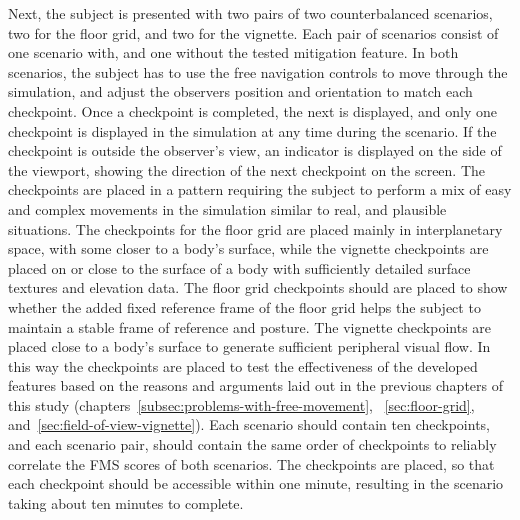 Next, the subject is presented with two pairs of two counterbalanced scenarios, two for the floor grid, and two for the
vignette.
Each pair of scenarios consist of one scenario with, and one without the tested mitigation feature.
In both scenarios, the subject has to use the free navigation controls to move through the simulation, and adjust
the observers position and orientation to match each checkpoint.
Once a checkpoint is completed, the next is displayed, and only one checkpoint is displayed in the simulation at any
time during the scenario.
If the checkpoint is outside the observer's view, an indicator is displayed on the side of the viewport, showing the
direction of the next checkpoint on the screen.
The checkpoints are placed in a pattern requiring the subject to perform a mix of easy and complex movements in the
simulation similar to real, and plausible situations.
The checkpoints for the floor grid are placed mainly in interplanetary space, with some closer to a body's surface,
while the vignette checkpoints are placed on or close to the surface of a body with sufficiently detailed surface
textures and elevation data.
The floor grid checkpoints should are placed to show whether the added fixed reference frame of the floor grid helps the
subject to maintain a stable frame of reference and posture.
The vignette checkpoints are placed close to a body's surface to generate sufficient peripheral visual flow.
In this way the checkpoints are placed to test the effectiveness of the developed features based on the reasons and
arguments laid out in the previous chapters of this study (chapters~\ref{subsec:problems-with-free-movement},
~\ref{sec:floor-grid}, and~\ref{sec:field-of-view-vignette}).
Each scenario should contain ten checkpoints, and each scenario pair, should contain the same order of checkpoints to
reliably correlate the FMS scores of both scenarios.
The checkpoints are placed, so that each checkpoint should be accessible within one minute, resulting in the scenario
taking about ten minutes to complete.

